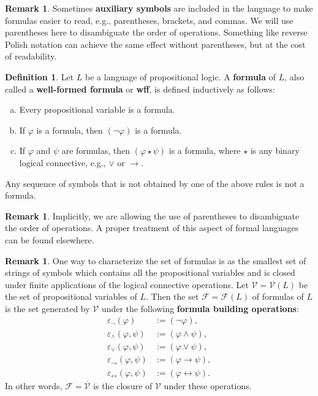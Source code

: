 \documentclass[12pt]{article}
\theoremstyle{definition}
\newtheorem{definition}[theorem]{Definition}
\newtheorem{remark}[theorem]{Remark}
\newcommand{\eps}{\varepsilon}
\renewcommand{\phi}{\varphi}
\newcommand{\<}{\langle}
\renewcommand{\>}{\rangle}
\newcommand{\clo}{\overline}
\newcommand{\FF}{\mathcal{F}}
\newcommand{\VV}{\mathcal{V}}
\newcommand{\keyword}{\textbf}
\newcommand{\liff}{\leftrightarrow}
\begin{document}
\begin{remark}
    Sometimes \keyword{auxiliary symbols} are included in the language to make formulas easier to read, e.g., parentheses, brackets, and commas.
    We will use parentheses here to disambiguate the order of operations.
    Something like reverse Polish notation can achieve the same effect without parentheses, but at the cost of readability.
\end{remark}



\begin{definition}
    Let $L$ be a language of propositional logic.
    A \keyword{formula} of $L$, also called a \keyword{well-formed formula} or \keyword{wff}, is defined inductively as follows:
    \begin{enumerate}[(a)]
        \item Every propositional variable is a formula.
        \item If $\phi$ is a formula, then $(\lnot\phi)$ is a formula.
        \item If $\phi$ and $\psi$ are formulas, then $(\phi \star \psi)$ is a formula, where $\star$ is any binary logical connective, e.g., $\lor$ or $\to$.
    \end{enumerate}
    Any sequence of symbols that is not obtained by one of the above rules is not a formula.
\end{definition}

\begin{remark}
    Implicitly, we are allowing the use of parentheses to disambiguate the order of operations.
    A proper treatment of this aspect of formal languages can be found elsewhere.
\end{remark}

\begin{remark}
    One way to characterize the set of formulas is as the smallest set of strings of symbols which contains all the propositional variables and is closed under finite applications of the logical connective operations.
    Let $\VV = \VV(L)$ be the set of propositional variables of $L$.
    Then the set $\FF = \FF(L)$ of formulas of $L$ is the set generated by $\VV$ under the following \keyword{formula building operations}:
    \begin{align*}
        \eps_\lnot(\phi) &:= (\lnot \phi), \\
        \eps_\land(\phi, \psi) &:= (\phi \land \psi), \\
        \eps_\lor(\phi, \psi) &:= (\phi \lor \psi), \\
        \eps_\to(\phi, \psi) &:= (\phi \to \psi), \\
        \eps_\liff(\phi, \psi) &:= (\phi \liff \psi).
    \end{align*}
    In other words, $\FF = \clo{\VV}$ is the closure of $\VV$ under these operations. 
\end{remark}
\end{document}
